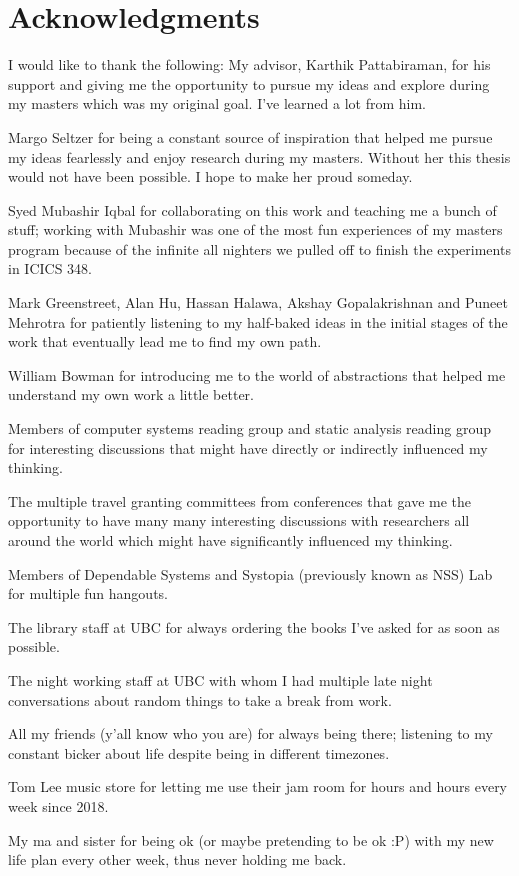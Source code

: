 
\chapter{Acknowledgments}

I would like to thank the following:
My advisor, Karthik Pattabiraman, for his support and giving me the opportunity to pursue my ideas and explore during my masters which was my original goal. I've learned a lot from him. 

Margo Seltzer for being a constant source of inspiration that helped me pursue my ideas fearlessly and enjoy research during my masters. Without her this thesis would not have been possible. I hope to make her proud someday. 

Syed Mubashir Iqbal for collaborating on this work and teaching me a bunch of stuff; working with Mubashir was one of the most fun experiences of my masters program because of the infinite all nighters we pulled off to finish the experiments in ICICS 348. 

Mark Greenstreet, Alan Hu, Hassan Halawa, Akshay Gopalakrishnan and Puneet Mehrotra for patiently listening to my half-baked ideas in the initial stages of the work that eventually lead me to find my own path. 

William Bowman for introducing me to the world of abstractions that helped me understand my own work a little better.  

Members of computer systems reading group and static analysis reading group for interesting discussions that might have directly or indirectly influenced my thinking. 

The multiple travel granting committees from conferences that gave me the opportunity to have many many interesting discussions with researchers all around the world which might have significantly influenced my thinking. 

Members of Dependable Systems and Systopia (previously known as NSS) Lab for multiple fun hangouts. 

The library staff at UBC for always ordering the books I've asked for as soon as possible.

The night working staff at UBC with whom I had multiple late night conversations about random things to take a break from work. 


All my friends (y'all know who you are) for always being there; listening to my constant bicker about life despite being in different timezones.   

Tom Lee music store for letting me use their jam room for hours and hours every week since 2018. 

My ma and sister for being ok (or maybe pretending to be ok :P) with my new life plan every other week, thus never holding me back. 




